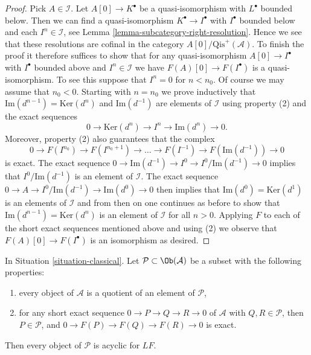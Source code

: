 \begin{proof}
Pick $A \in \mathcal{I}$.
Let $A[0] \to K^\bullet$ be a quasi-isomorphism with $L^\bullet$
bounded below. Then we can find a quasi-isomorphism
$K^\bullet \to I^\bullet$ with $I^\bullet$ bounded below and
each $I^n \in \mathcal{I}$, see
Lemma \ref{lemma-subcategory-right-resolution}.
Hence we see that these resolutions are cofinal in the category
$A[0]/\text{Qis}^{+}(\mathcal{A})$. To finish the proof it therefore
suffices to show that for any quasi-isomorphism
$A[0] \to I^\bullet$ with $I^\bullet$ bounded above and $I^n \in \mathcal{I}$
we have $F(A)[0] \to F(I^\bullet)$ is a quasi-isomorphism.
To see this suppose that $I^n = 0$ for $n < n_0$. Of course we may assume
that $n_0 < 0$. Starting with $n = n_0$ we prove inductively that
$\text{Im}(d^{n - 1}) = \text{Ker}(d^n)$ and $\text{Im}(d^{-1})$
are elements of $\mathcal{I}$ using property (2) and the exact sequences
$$
0 \to \text{Ker}(d^n) \to I^n \to \text{Im}(d^n) \to 0.
$$
Moreover, property (2) also guarantees that the complex
$$
0 \to F(I^{n_0}) \to F(I^{n_0 + 1}) \to \ldots \to F(I^{-1}) \to
F(\text{Im}(d^{-1})) \to 0
$$
is exact. The exact sequence
$0 \to \text{Im}(d^{-1}) \to I^0 \to I^0/\text{Im}(d^{-1}) \to 0$
implies that $I^0/\text{Im}(d^{-1})$ is an element of $\mathcal{I}$.
The exact sequence $0 \to A \to I^0/\text{Im}(d^{-1}) \to \text{Im}(d^0) \to 0$
then implies that $\text{Im}(d^0) = \text{Ker}(d^1)$ is an elements of
$\mathcal{I}$ and from then on one continues as before to show that
$\text{Im}(d^{n - 1}) = \text{Ker}(d^n)$ is an element of $\mathcal{I}$
for all $n > 0$. Applying $F$ to each of the short exact sequences
mentioned above and using (2) we observe that $F(A)[0] \to F(I^\bullet)$
is an isomorphism as desired.
\end{proof}

\begin{lemma}
\label{lemma-subcategory-left-acyclics}
In
Situation \ref{situation-classical}.
Let $\mathcal{P} \subset \Ob(\mathcal{A})$ be a subset with the
following properties:
\begin{enumerate}
\item every object of $\mathcal{A}$ is a quotient of an element of
$\mathcal{P}$,
\item for any short exact sequence $0 \to P \to Q \to R \to 0$ of
$\mathcal{A}$ with $Q, R \in \mathcal{P}$, then $P \in \mathcal{P}$,
and $0 \to F(P) \to F(Q) \to F(R) \to 0$ is exact.
\end{enumerate}
Then every object of $\mathcal{P}$ is acyclic for $LF$.
\end{lemma}

